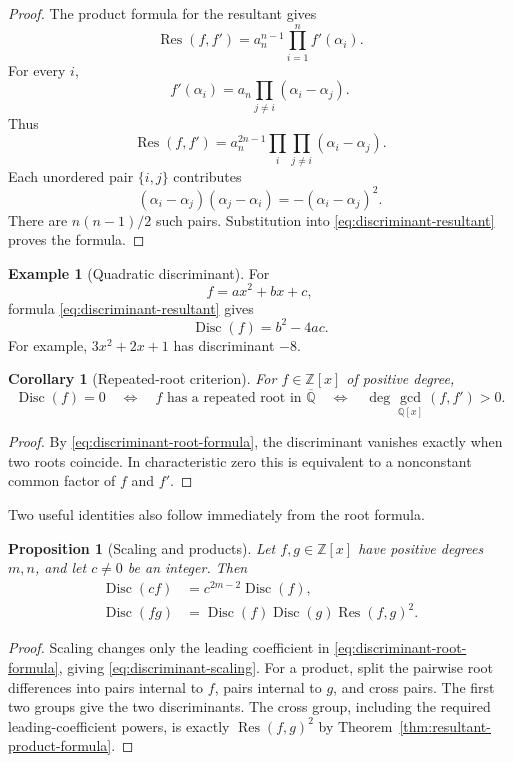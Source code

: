 \documentclass[11pt]{book}
\newtheorem{proposition}[theorem]{Proposition}
\newtheorem{corollary}[theorem]{Corollary}
\theoremstyle{definition}
\newtheorem{example}[theorem]{Example}
\newcommand{\ZZ}{\mathbb Z}
\begin{document}
\begin{proof}
The product formula for the resultant gives
\[
 \operatorname{Res}(f,f')
 =a_n^{n-1}\prod_{i=1}^n f'(\alpha_i).
\]
For every $i$,
\[
 f'(\alpha_i)=a_n\prod_{j\ne i}(\alpha_i-\alpha_j).
\]
Thus
\[
 \operatorname{Res}(f,f')
 =a_n^{2n-1}
   \prod_i\prod_{j\ne i}(\alpha_i-\alpha_j).
\]
Each unordered pair $\{i,j\}$ contributes
\[
 (\alpha_i-\alpha_j)(\alpha_j-\alpha_i)
 =-(\alpha_i-\alpha_j)^2.
\]
There are $n(n-1)/2$ such pairs.  Substitution into
\eqref{eq:discriminant-resultant} proves the formula.
\end{proof}

\begin{example}[Quadratic discriminant]
For
\[
 f=ax^2+bx+c,
\]
formula \eqref{eq:discriminant-resultant} gives
\[
 \operatorname{Disc}(f)=b^2-4ac.
\]
For example, $3x^2+2x+1$ has discriminant $-8$.
\end{example}

\begin{corollary}[Repeated-root criterion]\label{cor:discriminant-repeated-root}
For $f\in\ZZ[x]$ of positive degree,
\[
 \operatorname{Disc}(f)=0
 \quad\Longleftrightarrow\quad
 f\text{ has a repeated root in }\overline{\mathbb Q}
 \quad\Longleftrightarrow\quad
 \deg\gcd_{\mathbb Q[x]}(f,f')>0.
\]
\end{corollary}

\begin{proof}
By \eqref{eq:discriminant-root-formula}, the discriminant vanishes exactly
when two roots coincide.  In characteristic zero this is equivalent to a
nonconstant common factor of $f$ and $f'$.
\end{proof}

Two useful identities also follow immediately from the root formula.

\begin{proposition}[Scaling and products]\label{prop:discriminant-laws}
Let $f,g\in\ZZ[x]$ have positive degrees $m,n$, and let $c\ne0$ be an
integer.  Then
\begin{align}
 \operatorname{Disc}(cf)
 &=c^{2m-2}\operatorname{Disc}(f),
 \label{eq:discriminant-scaling}\\
 \operatorname{Disc}(fg)
 &=\operatorname{Disc}(f)\operatorname{Disc}(g)
   \operatorname{Res}(f,g)^2.
 \label{eq:discriminant-product}
\end{align}
\end{proposition}

\begin{proof}
Scaling changes only the leading coefficient in
\eqref{eq:discriminant-root-formula}, giving
\eqref{eq:discriminant-scaling}.  For a product, split the pairwise root
differences into pairs internal to $f$, pairs internal to $g$, and cross
pairs.  The first two groups give the two discriminants.  The cross group,
including the required leading-coefficient powers, is exactly
$\operatorname{Res}(f,g)^2$ by
Theorem~\ref{thm:resultant-product-formula}.
\end{proof}
\end{document}
